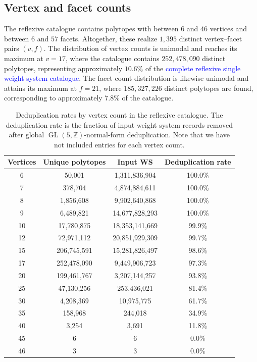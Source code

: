 \documentclass[appliedmath,article,submit,moreauthors]{Definitions/mdpi}
\newcommand{\Z}{\mathbb{Z}}
\newcommand{\GL}{\operatorname{GL}}
\begin{document}
\subsection{Vertex and facet counts}
\label{sec:results-vf}

The reflexive catalogue contains polytopes with between \(6\) and \(46\)
vertices and between \(6\) and \(57\) facets. Altogether, these realize
\(1{,}395\) distinct vertex--facet pairs \((v,f)\). The distribution of vertex
counts is unimodal and reaches its maximum at \(v=17\), where the catalogue
contains \(252{,}478{,}090\) distinct polytopes, representing approximately
\(10.6\%\) of the \textcolor{blue}{complete reflexive
single weight system catalogue}. The facet-count distribution is
likewise unimodal and attains its maximum at \(f=21\), where \(185{,}327{,}226\)
distinct polytopes are found, corresponding to approximately \(7.8\%\) of the
catalogue.

\begin{table}[H]
\caption{Deduplication rates by vertex count in the reflexive catalogue. The
deduplication rate is the fraction of input weight system records removed after
global \(\GL(5,\Z)\)-normal-form deduplication. Note that we have not included
entries for each vertex count.\label{tab:dedup}}
\begin{tabularx}{\textwidth}{CCCC}
\toprule
\textbf{Vertices} & \textbf{Unique polytopes} & \textbf{Input WS} &
  \textbf{Deduplication rate} \\
   & 50{,}001        & 1{,}311{,}836{,}904  & 100.0\% \\
7   & 378{,}704       & 4{,}874{,}884{,}611  & 100.0\% \\
8   & 1{,}856{,}608   & 9{,}902{,}640{,}868  & 100.0\% \\
9   & 6{,}489{,}821   & 14{,}677{,}828{,}293 & 100.0\% \\
10  & 17{,}780{,}875  & 18{,}353{,}141{,}669 & 99.9\% \\
12  & 72{,}971{,}112  & 20{,}851{,}929{,}309 & 99.7\% \\
15  & 206{,}745{,}591 & 15{,}281{,}826{,}497 & 98.6\% \\
17  & 252{,}478{,}090 & 9{,}449{,}906{,}723  & 97.3\% \\
20  & 199{,}461{,}767 & 3{,}207{,}144{,}257  & 93.8\% \\
25  & 47{,}130{,}256  & 253{,}436{,}021      & 81.4\% \\
30  & 4{,}208{,}369   & 10{,}975{,}775       & 61.7\% \\
35  & 158{,}968       & 244{,}018            & 34.9\% \\
40  & 3{,}254         & 3{,}691              & 11.8\% \\
45  & 6               & 6                    & 0.0\% \\
46  & 3               & 3                    & 0.0\% \\
\bottomrule
\end{tabularx}
\end{table}
\end{document}
